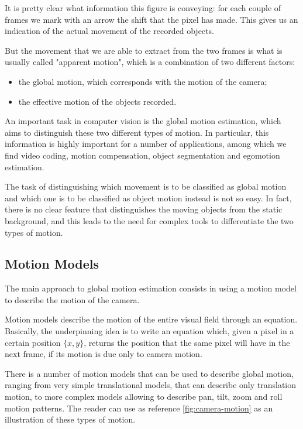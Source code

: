 It is pretty clear what information this figure is conveying: for each couple of frames we mark with an arrow the shift that the pixel has made. This gives us an indication of the actual movement of the recorded objects.

But the movement that we are able to extract from the two frames is what is usually called "apparent motion", which is a combination of two different factors:
\begin{itemize}
    \item the global motion, which corresponds with the motion of the camera;
    \item the effective motion of the objects recorded.
\end{itemize}

An important task in computer vision is the global motion estimation, which aims to distinguish these two different types of motion.
In particular, this information is highly important for a number of applications, among which we find video coding, motion compensation, object segmentation and egomotion estimation.

The task of distinguishing which movement is to be classified as global motion and which one is to be classified as object motion instead is not so easy. In fact, there is no clear feature that distinguishes the moving objects from the static background, and this leads to the need for complex tools to differentiate the two types of motion.


\subsection{Motion Models}
\label{sec:motion-models}

The main approach to global motion estimation consists in using a motion model to describe the motion of the camera.

Motion models describe the motion of the entire visual field through an equation. Basically, the underpinning idea is to write an equation which, given a pixel in a certain position $\{x,y\}$, returns the position that the same pixel will have in the next frame, if its motion is due only to camera motion.

There is a number of motion models that can be used to describe global motion, ranging from very simple translational models, that can describe only translation motion, to more complex models allowing to describe pan, tilt, zoom and roll motion patterns. The reader can use as reference \cref{fig:camera-motion} as an illustration of these types of motion.

